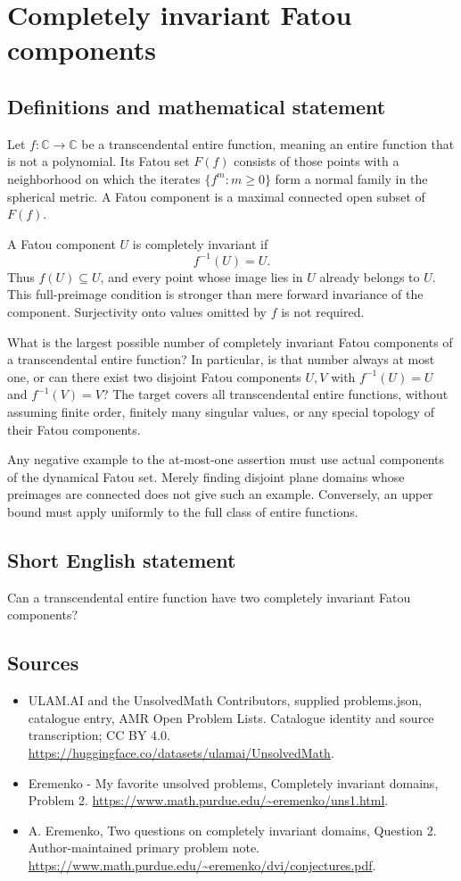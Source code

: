 \documentclass[11pt,a4paper]{article}
\begin{document}
\section*{Completely invariant Fatou components}\label{statement}

\subsection{Definitions and mathematical statement}
Let $f:\mathbb C\to\mathbb C$ be a transcendental entire
function, meaning an entire function that is not a polynomial.
Its Fatou set $F(f)$ consists of those points with a neighborhood
on which the iterates $\{f^m:m\geq0\}$ form a normal family
in the spherical metric. A Fatou component is a maximal
connected open subset of $F(f)$.

A Fatou component $U$ is completely invariant if
\[
                      f^{-1}(U)=U.
\]
Thus $f(U)\subseteq U$, and every point whose image lies in
$U$ already belongs to $U$. This full-preimage condition is
stronger than mere forward invariance of the component.
Surjectivity onto values omitted by $f$ is not required.

What is the largest possible number of completely invariant
Fatou components of a transcendental entire function? In
particular, is that number always at most one, or can there
exist two disjoint Fatou components $U,V$ with
$f^{-1}(U)=U$ and $f^{-1}(V)=V$?
The target covers all transcendental entire functions,
without assuming finite order, finitely many singular values,
or any special topology of their Fatou components.

Any negative example to the at-most-one assertion must use
actual components of the dynamical Fatou set. Merely finding
disjoint plane domains whose preimages are connected does
not give such an example. Conversely, an upper bound must
apply uniformly to the full class of entire functions.
\subsection{Short English statement}
Can a transcendental entire function have two completely invariant Fatou components?
\subsection{Sources}
\begin{itemize}
\item[S1] ULAM.AI and the UnsolvedMath Contributors, supplied problems.json, catalogue entry, AMR Open Problem Lists. Catalogue identity and source transcription; CC BY 4.0.
\url{https://huggingface.co/datasets/ulamai/UnsolvedMath}.
\item[S2] Eremenko - My favorite unsolved problems, Completely invariant domains, Problem 2. 
\url{https://www.math.purdue.edu/~eremenko/uns1.html}.
\item[S3] A. Eremenko, Two questions on completely invariant domains, Question 2. Author-maintained primary problem note.
\url{https://www.math.purdue.edu/~eremenko/dvi/conjectures.pdf}.
\end{itemize}
\end{document}
